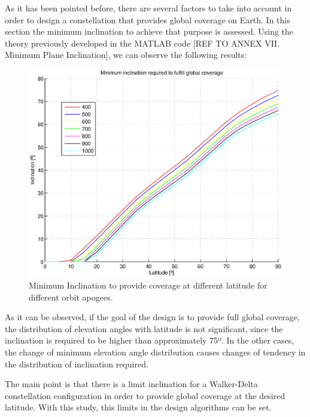 As it has been pointed before, there are several factors to take into account in order to design a constellation that provides global coverage on Earth. In this section the minimum inclination to achieve that purpose is assessed. Using the theory previously developed in the MATLAB code [{REF TO ANNEX VII. Minimum Plane Inclination}], we can observe the following results:

\begin{figure}[H]
\includegraphics[scale=0.8]{MinimumInclinationPlot}
\caption{Minimum Inclination to provide coverage at different latitude for different orbit apogees.}	
\end{figure}

As it can be observed, if the goal of the design is to provide full global coverage, the distribution of elevation angles with latitude is not significant, since the inclination is required to be higher than approximately 75º. In the other cases, the change of minimum elevation angle distribution causes changes of tendency in the distribution of inclination required. 

The main point is that there is a limit inclination for a Walker-Delta constellation configuration in order to provide global coverage at the desired latitude. With this study, this limits in the design algorithms can be set.